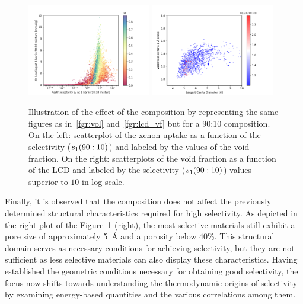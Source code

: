 \documentclass[main.tex]{subfiles}
\begin{document}
\begin{figure}[ht!]
  \centering
  \includegraphics[width=0.48\textwidth]{figures/2-thermo/Scatterplot_uptake_selectivity_vol_9010.pdf}  
  \includegraphics[width=0.48\textwidth]{figures/2-thermo/Scatterplot_vf_lcd_selectivity9010.pdf}
  \caption{Illustration of the effect of the composition by representing the same figures as in~\ref{fgr:vol} and~\ref{fgr:lcd_vf} but for a 90:10 composition. On the left: scatterplot of the xenon uptake as a function of the selectivity ($s_{\text{1}}(90:10)$) and labeled by the values of the void fraction. On the right: scatterplots of the void fraction as a function of the LCD and labeled by the selectivity ($s_{\text{1}}(90:10)$) values superior to $10$ in log-scale.}\label{fgr:compo}
\end{figure}

Finally, it is observed that the composition does not affect the previously determined structural characteristics required for high selectivity. As depicted in the right plot of the Figure~\ref{fgr:compo} (right), the most selective materials still exhibit a pore size of approximately \SI{5}{\angstrom} and a porosity below {$40$\%}. This structural domain serves as necessary conditions for achieving selectivity, but they are not sufficient as less selective materials can also display these characteristics. Having established the geometric conditions necessary for obtaining good selectivity, the focus now shifts towards understanding the thermodynamic origins of selectivity by examining energy-based quantities and the various correlations among them.
\end{document}
